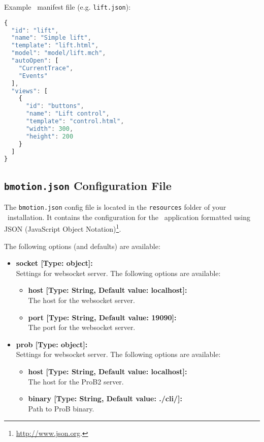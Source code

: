 Example \bms\ manifest file (e.g. \texttt{lift.json}):

\begin{lstlisting}[language=JavaScript]
{
  "id": "lift",
  "name": "Simple lift",
  "template": "lift.html",
  "model": "model/lift.mch",
  "autoOpen": [
  	"CurrentTrace",
    "Events"
  ],
  "views": [
    {
      "id": "buttons",
      "name": "Lift control",
      "template": "control.html",
      "width": 300,
      "height": 200
    }
  ]
}
\end{lstlisting}

\subsection{\texttt{bmotion.json} Configuration File}
\label{sec:configfile}

The \texttt{bmotion.json} config file is located in the \texttt{resources} folder of your \bms\ installation.
It contains the configuration for the \bms\ application formatted using JSON (JavaScript Object Notation)\footnote{\url{http://www.json.org}.}.


The following options (and defaults) are available:

\begin{itemize}

	\item[] \textbf{socket [Type: object]:}\\ Settings for websocket server. The following options are available:
	\begin{itemize}
		\item[] \textbf{host [Type: String, Default value: localhost]:}\\ The host for the websocket server.
		\item[] \textbf{port [Type: String, Default value: 19090]:}\\ The port for the websocket server.
	\end{itemize}

	\item[] \textbf{prob [Type: object]:}\\ Settings for websocket server. The following options are available:
	\begin{itemize}
		\item[] \textbf{host [Type: String, Default value: localhost]:}\\ The host for the ProB2 server.
		\item[] \textbf{binary [Type: String, Default value: ./cli/]:}\\ Path to ProB binary.
	\end{itemize}

\end{itemize}